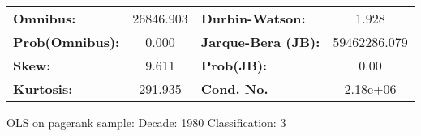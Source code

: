 \begin{center}
\begin{tabular}{lccccc}
\bottomrule
\end{tabular}
\begin{tabular}{lclc}
\textbf{Omnibus:}       & 26846.903 & \textbf{  Durbin-Watson:     } &      1.928    \\
\textbf{Prob(Omnibus):} &    0.000  & \textbf{  Jarque-Bera (JB):  } & 59462286.079  \\
\textbf{Skew:}          &    9.611  & \textbf{  Prob(JB):          } &       0.00    \\
\textbf{Kurtosis:}      &  291.935  & \textbf{  Cond. No.          } &   2.18e+06    \\
\bottomrule
\end{tabular}
\end{center}
\break
OLS on pagerank sample: Decade: 1980 Classification: 3
